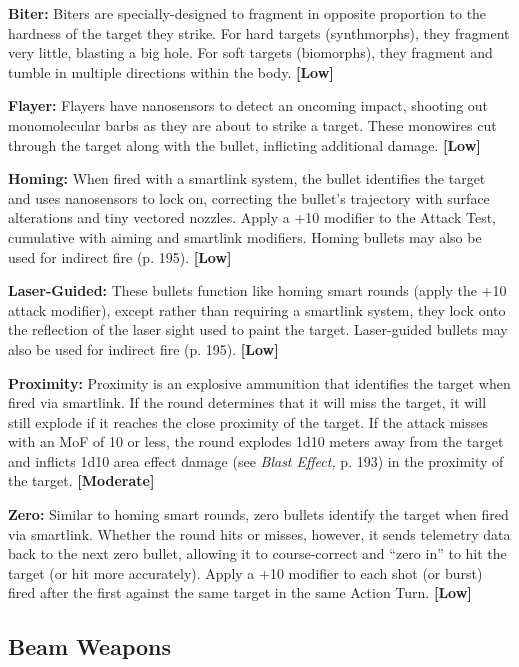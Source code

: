 \textbf{Biter:} Biters are specially-designed to fragment in 
opposite proportion to the hardness of the target they 
strike. For hard targets (synthmorphs), they fragment
very little, blasting a big hole. For soft targets
(biomorphs), they fragment and tumble in multiple 
directions within the body. \textbf{[Low]}

\textbf{Flayer:} Flayers have nanosensors to detect an oncoming
impact, shooting out monomolecular barbs
as they are about to strike a target. These monowires 
cut through the target along with the bullet, inflicting 
additional damage. \textbf{[Low]}

\textbf{Homing:} When fired with a smartlink system, the 
bullet identifies the target and uses nanosensors to 
lock on, correcting the bullet's trajectory with surface 
alterations and tiny vectored nozzles. Apply a +10 
modifier to the Attack Test, cumulative with aiming 
and smartlink modifiers. Homing bullets may also be 
used for indirect fire (p. 195). \textbf{[Low]}

\textbf{Laser-Guided:} These bullets function like homing 
smart rounds (apply the +10 attack modifier), except 
rather than requiring a smartlink system, they lock 
onto the reflection of the laser sight used to paint 
the target. Laser-guided bullets may also be used for 
indirect fire (p. 195). \textbf{[Low]}

\textbf{Proximity:} Proximity is an explosive ammunition 
that identifies the target when fired via smartlink. If 
the round determines that it will miss the target, it will 
still explode if it reaches the close proximity of the 
target. If the attack misses with an MoF of 10 or less, 
the round explodes 1d10 meters away from the target 
and inflicts 1d10 area effect damage (see \textit{Blast Effect,}
p. 193) in the proximity of the target. \textbf{[Moderate]}

\textbf{Zero:} Similar to homing smart rounds, zero bullets 
identify the target when fired via smartlink. Whether 
the round hits or misses, however, it sends telemetry
data back to the next zero bullet, allowing it to
course-correct and ``zero in'' to hit the target (or hit 
more accurately). Apply a +10 modifier to each shot 
(or burst) fired after the first against the same target in 
the same Action Turn. \textbf{[Low]}

\subsection{Beam Weapons}

